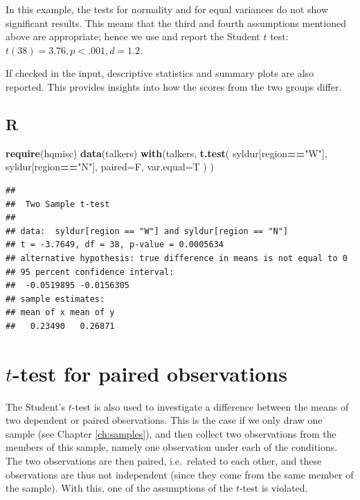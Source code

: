 \documentclass[
]{book}
\newenvironment{Shaded}{\begin{snugshade}}{\end{snugshade}}
\newcommand{\DataTypeTok}[1]{\textcolor[rgb]{0.13,0.29,0.53}{#1}}
\newcommand{\KeywordTok}[1]{\textcolor[rgb]{0.13,0.29,0.53}{\textbf{#1}}}
\newcommand{\NormalTok}[1]{#1}
\newcommand{\OperatorTok}[1]{\textcolor[rgb]{0.81,0.36,0.00}{\textbf{#1}}}
\newcommand{\StringTok}[1]{\textcolor[rgb]{0.31,0.60,0.02}{#1}}
\begin{document}
In this example, the tests for normality and for equal variances do not show significant results. This means that the third and fourth assumptions mentioned above are appropriate; hence we use and report the Student \(t\) test: \(t(38)=3.76, p<.001, d=1.2\).

If checked in the input, descriptive statistics and summary plots are also reported. This provides insights into how the scores from the two groups differ.

\hypertarget{sec:R-ttest-unpaired}{%
\subsection{R}\label{sec:R-ttest-unpaired}}

\begin{Shaded}
\begin{Highlighting}[]
\KeywordTok{require}\NormalTok{(hqmisc)}
\KeywordTok{data}\NormalTok{(talkers)}
\KeywordTok{with}\NormalTok{(talkers, }\KeywordTok{t.test}\NormalTok{( syldur[region}\OperatorTok{==}\StringTok{"W"}\NormalTok{], syldur[region}\OperatorTok{==}\StringTok{"N"}\NormalTok{], }
            \DataTypeTok{paired=}\NormalTok{F, }\DataTypeTok{var.equal=}\NormalTok{T ) )}
\end{Highlighting}
\end{Shaded}

\begin{verbatim}
## 
##  Two Sample t-test
## 
## data:  syldur[region == "W"] and syldur[region == "N"]
## t = -3.7649, df = 38, p-value = 0.0005634
## alternative hypothesis: true difference in means is not equal to 0
## 95 percent confidence interval:
##  -0.0519895 -0.0156305
## sample estimates:
## mean of x mean of y 
##   0.23490   0.26871
\end{verbatim}

\hypertarget{sec:ttest-paired}{%
\section{\texorpdfstring{\(t\)-test for paired observations}{t-test for paired observations}}\label{sec:ttest-paired}}

The Student's \(t\)-test is also used to investigate a difference between the
means of two dependent or paired observations. This is the case if we only draw
one sample (see Chapter \ref{ch:samples}), and then collect two observations
from the members of this sample,
namely one observation under each of the conditions. The two
observations are then paired, i.e.~related to each other,
and these observations are thus not independent (since they come
from the same member of the sample). With this, one of the assumptions of
the \(t\)-test is violated.
\end{document}
